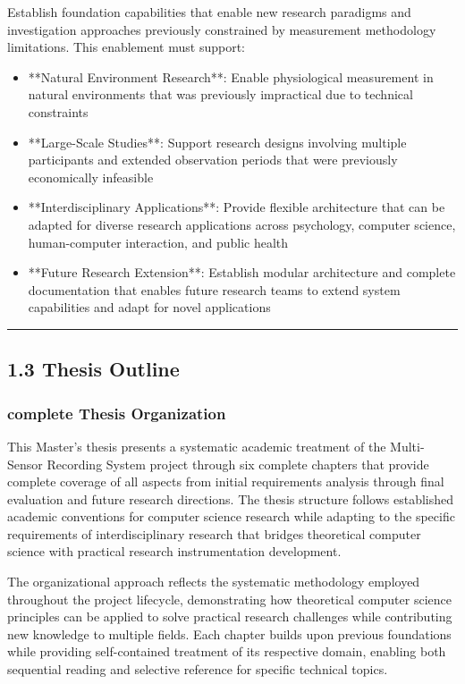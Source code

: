 \documentclass[11pt,a4paper]{article}
\begin{document}
Establish foundation capabilities that enable new research paradigms and
investigation approaches previously constrained
by measurement methodology limitations. This enablement must support:

\begin{itemize}
\item **Natural Environment Research**: Enable physiological measurement in
natural environments that was previously
  impractical due to technical constraints
\item **Large-Scale Studies**: Support research designs involving multiple
participants and extended observation periods
  that were previously economically infeasible
\item **Interdisciplinary Applications**: Provide flexible architecture that can
be adapted for diverse research
applications across psychology, computer science, human-computer interaction,
and public health
\item **Future Research Extension**: Establish modular architecture and complete
documentation that enables future
  research teams to extend system capabilities and adapt for novel applications

\end{itemize}
\hrule

\subsection{1.3 Thesis Outline}

\subsubsection{complete Thesis Organization}

This Master's thesis presents a systematic academic treatment of the
Multi-Sensor Recording System project through six
complete chapters that provide complete coverage of all aspects from initial
requirements analysis through final
evaluation and future research directions. The thesis structure follows
established academic conventions for computer
science research while adapting to the specific requirements of
interdisciplinary research that bridges theoretical
computer science with practical research instrumentation development.

The organizational approach reflects the systematic methodology employed
throughout the project lifecycle, demonstrating
how theoretical computer science principles can be applied to solve practical
research challenges while contributing new
knowledge to multiple fields. Each chapter builds upon previous foundations
while providing self-contained treatment of
its respective domain, enabling both sequential reading and selective reference
for specific technical topics.
\end{document}
